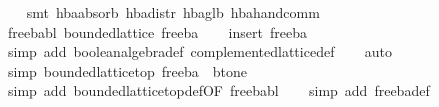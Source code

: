 \begin{isabellebody}
\ \ \isamarkupfalse%
\ {}smt\ hba{}absorb{}\ hba{}distr\ hba{}glb{}\ hba{}hand{}comm{}%
\endisatagproof
{\isafoldproof}%
%
\isadelimproof
\isanewline
%
\endisadelimproof
\isanewline
{}\isamarkupfalse%
\ free{}ba{}bl{}\ {}bounded{}lattice\ free{}ba{}\isanewline
%
\isadelimproof
\ \ %
\endisadelimproof
%
\isatagproof
{}\isamarkupfalse%
\ {}insert\ free{}ba{}\isanewline
\ \ \isamarkupfalse%
\ {}simp\ add{}\ boolean{}algebra{}def\ complemented{}lattice{}def{}\isanewline
\ \ \isamarkupfalse%
\ auto\isanewline
\ \ \isamarkupfalse%
%
\endisatagproof
{\isafoldproof}%
%
\isadelimproof
\isanewline
%
\endisadelimproof
\isanewline
{}\isamarkupfalse%
\ {}simp{}{}\ {}bounded{}lattice{}top\ free{}ba\ {}\ bt{}one{}\isanewline
%
\isadelimproof
\ \ %
\endisadelimproof
%
\isatagproof
{}\isamarkupfalse%
\ {}simp\ add{}\ bounded{}lattice{}top{}def{}OF\ free{}ba{}bl{}{}\isanewline
\ \ \isamarkupfalse%
\ {}simp\ add{}\ free{}ba{}def{}\isanewline

\end{isabellebody}
